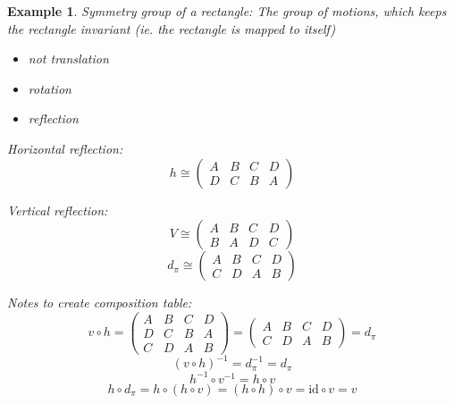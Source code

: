 \documentclass[a4paper,landscape,twocolumn]{article}
\newtheorem{ex}{Example}[section]
\begin{document}
\begin{ex}
  \label{bsp-2-14}
  Symmetry group of a rectangle:
  The group of motions, which keeps the rectangle invariant
  (ie. the rectangle is mapped to itself)
  \begin{itemize}
    \item \emph{not} translation
    \item rotation
    \item reflection
  \end{itemize}

  Horizontal reflection:
  \[
    h \cong
    \begin{pmatrix}
      A & B & C & D \\
      D & C & B & A
    \end{pmatrix}
  \]

  Vertical reflection:
  \[
    V \cong
    \begin{pmatrix}
      A & B & C & D \\
      B & A & D & C
    \end{pmatrix}
  \]
  \[
    d_\pi \cong
    \begin{pmatrix}
      A & B & C & D \\
      C & D & A & B
    \end{pmatrix}
  \]

  Notes to create composition table:
  \[
    v \circ h =
    \begin{pmatrix}
      A & B & C & D \\
      D & C & B & A \\
      C & D & A & B
    \end{pmatrix}
    = \begin{pmatrix}
      A & B & C & D \\
      C & D & A & B
    \end{pmatrix}
    = d_\pi
  \]
  \[ (v \circ h)^{-1} = d_\pi^{-1} = d_\pi \]
  \[ h^{-1} \circ v^{-1} = h \circ v \]
  \[ h \circ d_\pi = h\circ (h\circ v) = (h \circ h) \circ v = \text{id} \circ v = v \]


\end{ex}
\end{document}
